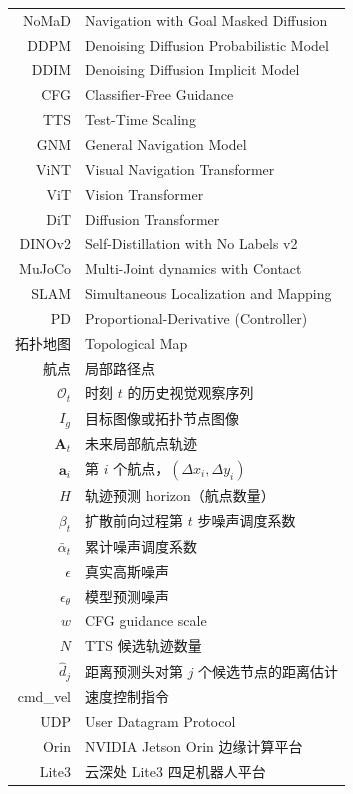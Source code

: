 
\begin{nomenclature}
\label{chap:symb}

\begin{longtable}{rl}
  NoMaD           & Navigation with Goal Masked Diffusion \\
  DDPM            & Denoising Diffusion Probabilistic Model \\
  DDIM            & Denoising Diffusion Implicit Model \\
  CFG             & Classifier-Free Guidance \\
  TTS             & Test-Time Scaling \\
  GNM             & General Navigation Model \\
  ViNT            & Visual Navigation Transformer \\
  ViT             & Vision Transformer \\
  DiT             & Diffusion Transformer \\
  DINOv2          & Self-Distillation with No Labels v2 \\
  MuJoCo          & Multi-Joint dynamics with Contact \\
  SLAM            & Simultaneous Localization and Mapping \\
  PD              & Proportional-Derivative (Controller) \\
  拓扑地图        & Topological Map \\
  航点            & 局部路径点 \\
  $\mathcal{O}_t$ & 时刻 $t$ 的历史视觉观察序列 \\
  $I_g$           & 目标图像或拓扑节点图像 \\
  $\mathbf{A}_t$  & 未来局部航点轨迹 \\
  $\mathbf{a}_i$  & 第 $i$ 个航点，$(\Delta x_i, \Delta y_i)$ \\
  $H$             & 轨迹预测 horizon（航点数量） \\
  $\beta_t$       & 扩散前向过程第 $t$ 步噪声调度系数 \\
  $\bar\alpha_t$  & 累计噪声调度系数 \\
  $\epsilon$      & 真实高斯噪声 \\
  $\epsilon_\theta$ & 模型预测噪声 \\
  $w$             & CFG guidance scale \\
  $N$             & TTS 候选轨迹数量 \\
  $\hat d_j$      & 距离预测头对第 $j$ 个候选节点的距离估计 \\
  cmd\_vel        & 速度控制指令 \\
  UDP             & User Datagram Protocol \\
  Orin            & NVIDIA Jetson Orin 边缘计算平台 \\
  Lite3           & 云深处 Lite3 四足机器人平台 \\
\end{longtable}

\end{nomenclature}
